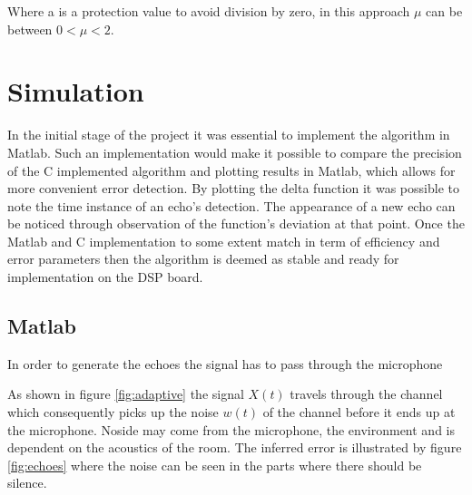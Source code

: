 \documentclass[a4paper,11pt,twoside]{article}
\begin{document}
Where a is a protection value to avoid division by zero, in this approach $\mu$ can be between $0 < \mu < 2$.

 






\section{Simulation}
In the initial stage of the project it was essential to implement the algorithm in Matlab. Such an implementation would make it possible to compare the precision of the C implemented algorithm and plotting results in Matlab, which allows for more convenient error detection. By plotting the delta function it was possible to note the time instance of an echo's detection. The appearance of a new echo can be noticed through observation of the function's deviation at that point. Once the Matlab and C implementation to some extent match in term of efficiency and error parameters then the algorithm is deemed as stable and ready for implementation on the DSP board.

\subsection{Matlab}

In order to generate the echoes the signal has to pass through the microphone 

As shown in figure \ref{fig:adaptive} the signal $X(t)$ travels through the channel which consequently picks up the noise $w(t)$ of the channel before it ends up at the microphone. Noside may come from the microphone, the environment and is dependent on the acoustics of the room. The inferred error is illustrated by figure \ref{fig:echoes} where the noise can be seen in the parts where there should be silence.
\end{document}
